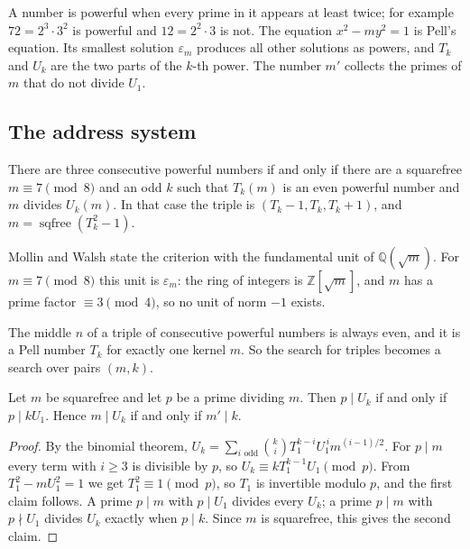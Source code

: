 \inwords A number is powerful when every prime in it appears at least twice; for example $72 = 2^3 \cdot 3^2$ is powerful and $12 = 2^2 \cdot 3$
is not. The equation $x^2 - m y^2 = 1$ is Pell's equation. Its smallest solution $\varepsilon_m$ produces all other solutions as powers, and
$T_k$ and $U_k$ are the two parts of the $k$-th power. The number $m'$ collects the primes of $m$ that do not divide $U_1$.

\subsection{The address system}

\begin{lemma}
There are three consecutive powerful numbers if and only if there are a squarefree $m \equiv 7 \pmod 8$ and an odd $k$ such that
$T_k(m)$ is an even powerful number and $m$ divides $U_k(m)$. In that case the triple is $(T_k - 1, T_k, T_k + 1)$, and
$m = \operatorname{sqfree}(T_k^2 - 1)$.
\end{lemma}

Mollin and Walsh state the criterion with the fundamental unit of $\mathbb{Q}(\sqrt{m})$. For $m \equiv 7 \pmod 8$ this unit is
$\varepsilon_m$: the ring of integers is $\mathbb{Z}[\sqrt{m}]$, and $m$ has a prime factor $\equiv 3 \pmod 4$, so no unit of norm $-1$ exists.

\inwords The middle $n$ of a triple of consecutive powerful numbers is always even, and it is a Pell number $T_k$ for exactly one kernel $m$.
So the search for triples becomes a search over pairs $(m, k)$.

\begin{lemma}
Let $m$ be squarefree and let $p$ be a prime dividing $m$. Then $p \mid U_k$ if and only if $p \mid k U_1$. Hence $m \mid U_k$ if and only
if $m' \mid k$.
\end{lemma}

\begin{proof}
By the binomial theorem, $U_k = \sum_{i \text{ odd}} \binom{k}{i} T_1^{k-i} U_1^{\,i} m^{(i-1)/2}$. For $p \mid m$ every term with $i \ge 3$ is
divisible by $p$, so $U_k \equiv k T_1^{k-1} U_1 \pmod p$. From $T_1^2 - m U_1^2 = 1$ we get $T_1^2 \equiv 1 \pmod p$, so $T_1$ is invertible
modulo $p$, and the first claim follows. A prime $p \mid m$ with $p \mid U_1$ divides every $U_k$; a prime $p \mid m$ with $p \nmid U_1$
divides $U_k$ exactly when $p \mid k$. Since $m$ is squarefree, this gives the second claim.
\end{proof}

